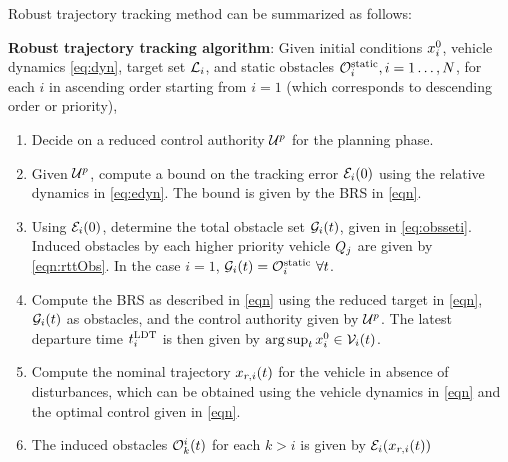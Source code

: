 Robust trajectory tracking method can be summarized as follows:
\begin{alg}
\label{alg:rtt}
\textbf{Robust trajectory tracking algorithm}: Given initial conditions $x_i^0$, vehicle dynamics \eqref{eq:dyn}, target set $\mathcal{L}_i$, and static obstacles $\mathcal{O}^\text{static}_i, i = 1\ldots, N$, for each $i$ in ascending order starting from $i=1$ (which corresponds to descending order or priority),
\begin{enumerate}
\item Decide on a reduced control authority $\mathcal{U}^p$ for the planning phase. 
\item Given $\mathcal{U}^p$, compute a bound on the tracking error $\mathcal{E}_i(0)$ using the relative dynamics in \eqref{eq:edyn}. The bound is given by the BRS in \eqref{eqn}.
\item Using $\mathcal{E}_i(0)$, determine the total obstacle set $\mathcal{G}_i(t)$, given in \eqref{eq:obsseti}. Induced obstacles by each higher priority vehicle $Q_j$ are given by \eqref{eqn:rttObs}. In the case $i=1$, $\mathcal{G}_i(t) = \mathcal{O}^\text{static}_i ~ \forall t$.
\item Compute the BRS as described in \eqref{eqn} using the reduced target in \eqref{eqn}, $\mathcal{G}_i(t)$ as obstacles, and the control authority given by $\mathcal{U}^p$. The latest departure time $t^\text{LDT}_i$ is then given by $\arg \sup_t x^0_i \in \mathcal{V}_i(t)$.
\item Compute the nominal trajectory $x_{r,i}(t)$ for the vehicle in absence of disturbances, which can be obtained using the vehicle dynamics in \eqref{eqn} and the optimal control given in \eqref{eqn}.
\item The induced obstacles $\mathcal{O}_k^i(t)$ for each $k>i$ is given by $\mathcal{E}_i(x_{r,i}(t))$
\end{enumerate}
\end{alg}



